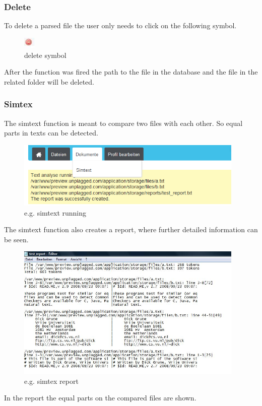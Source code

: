\subsubsection{Delete}
To delete a parsed file the user only needs to click on the following symbol.
\begin{figure}[!ht]
  \centering
    \includegraphics[width=0.05\textwidth]{images/basic_functionalities/delete_symbol.jpg}
  \caption{delete symbol}
  \label{fig:delete symbol}
\end{figure}
After the function was fired the path to the file in the database and the file in the related folder will be deleted.
\subsubsection{Simtex}
The simtext function is meant to compare two files with each other. So equal parts in texts can be detected.
\begin{figure}[!ht]
  \centering
    \includegraphics[width=0.97\textwidth]{images/basic_functionalities/simtext_running.png}
  \caption{e.g. simtext running}
  \label{fig: simtext running}
\end{figure}
The simtext function also creates a report, where further detailed information can be seen.
\begin{figure}[!ht]
  \centering
    \includegraphics[width=0.97\textwidth]{images/basic_functionalities/simtext_report.jpg}
  \caption{e.g. simtex report}
  \label{fig:e.g. simtex report}
\end{figure}
In the report the equal parts on the compared files are shown.
